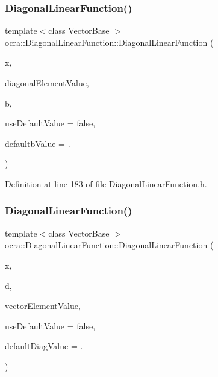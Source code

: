 \subsubsection{\texorpdfstring{Diagonal\+Linear\+Function()}{DiagonalLinearFunction()}\hspace{0.1cm}{\footnotesize\ttfamily [2/5]}}
{\footnotesize\ttfamily template$<$class Vector\+Base $>$ \\
ocra\+::\+Diagonal\+Linear\+Function\+::\+Diagonal\+Linear\+Function (\begin{DoxyParamCaption}\item[{\hyperlink{classocra_1_1Variable}{Variable} \&}]{x,  }\item[{const double}]{diagonal\+Element\+Value,  }\item[{const Vector\+Base \&}]{b,  }\item[{const bool}]{use\+Default\+Value = {\ttfamily false},  }\item[{const double}]{defaultb\+Value = {.} }\end{DoxyParamCaption})\hspace{0.3cm}{\ttfamily [inline]}}



Definition at line 183 of file Diagonal\+Linear\+Function.\+h.

\hypertarget{classocra_1_1DiagonalLinearFunction_a4cd597044d6af815e1c6cec976958c54}{}\label{classocra_1_1DiagonalLinearFunction_a4cd597044d6af815e1c6cec976958c54} 
\subsubsection{\texorpdfstring{Diagonal\+Linear\+Function()}{DiagonalLinearFunction()}\hspace{0.1cm}{\footnotesize\ttfamily [3/5]}}
{\footnotesize\ttfamily template$<$class Vector\+Base $>$ \\
ocra\+::\+Diagonal\+Linear\+Function\+::\+Diagonal\+Linear\+Function (\begin{DoxyParamCaption}\item[{\hyperlink{classocra_1_1Variable}{Variable} \&}]{x,  }\item[{const Vector\+Base \&}]{d,  }\item[{const double}]{vector\+Element\+Value,  }\item[{const bool}]{use\+Default\+Value = {\ttfamily false},  }\item[{const double}]{default\+Diag\+Value = {.} }\end{DoxyParamCaption})\hspace{0.3cm}{\ttfamily [inline]}}



